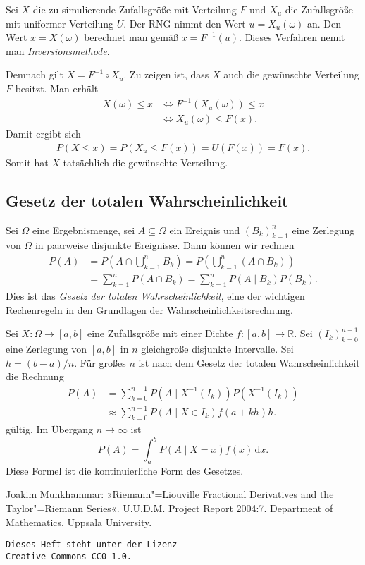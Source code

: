 \documentclass[a4paper,10pt,fleqn,twocolumn,twoside,dvipdfmx]{scrartcl}
\numberwithin{equation}{section}
\newcommand{\R}{\mathbb R}
\theoremstyle{rmbox}
\begin{document}
Sei $X$ die zu simulierende Zufallsgröße mit Verteilung $F$
und $X_u$ die Zufallsgröße mit uniformer Verteilung $U$. Der RNG
nimmt den Wert $u=X_u(\omega)$ an. Den Wert $x=X(\omega)$ berechnet
man gemäß $x=F^{-1}(u)$. Dieses Verfahren nennt man
\emph{Inversionsmethode}.

Demnach gilt $X=F^{-1}\circ X_u$. Zu zeigen ist, dass $X$ auch
die gewünschte Verteilung $F$ besitzt. Man erhält
\begin{align}
X(\omega)\le x&\iff F^{-1}(X_u(\omega))\le x\\
&\iff X_u(\omega)\le F(x).
\end{align}
Damit ergibt sich
\begin{gather}
P(X\le x) = P(X_u\le F(x)) = U(F(x)) = F(x).
\end{gather}
Somit hat $X$ tatsächlich die gewünschte Verteilung.

\subsection{Gesetz der totalen Wahrscheinlichkeit}

Sei $\Omega$ eine Ergebnismenge, sei $A\subseteq\Omega$ ein
Ereignis und $(B_k)_{k=1}^n$ eine Zerlegung von $\Omega$ in
paarweise disjunkte Ereignisse. Dann können wir rechnen
\begin{align*}
P(A) &= P(A\cap\bigcup_{k=1}^n B_k) = 
P(\bigcup_{k=1}^n (A\cap B_k))\\
&= \sum_{k=1}^n P(A\cap B_k)
= \sum_{k=1}^n P(A\mid B_k)P(B_k).
\end{align*}
Dies ist das \emph{Gesetz der totalen Wahrscheinlichkeit}, eine der
wichtigen Rechenregeln in den Grundlagen der
Wahrscheinlichkeitsrechnung.

Sei $X\colon\Omega\to [a,b]$ eine Zufallsgröße mit einer
Dichte $f\colon [a,b]\to \R$. Sei
$(I_k)_{k=0}^{n-1}$ eine Zerlegung von $[a,b]$ in $n$ gleichgroße
disjunkte Intervalle. Sei $h=(b-a)/n$. Für großes $n$
ist nach dem Gesetz der totalen Wahrscheinlichkeit die Rechnung
\begin{align*}
P(A) &= \sum_{k=0}^{n-1} P(A\mid X^{-1}(I_k))P(X^{-1}(I_k))\\
&\approx \sum_{k=0}^{n-1} P(A\mid X\in I_k)f(a+kh)h.
\end{align*}
gültig. Im Übergang $n\to\infty$ ist
\begin{equation}
P(A) = \int_a^b P(A\mid X=x)f(x)\,\mathrm dx.
\end{equation}
Diese Formel ist die kontinuierliche Form des Gesetzes.

\begin{thebibliography}{x}
\bibitem{} Joakim Munkhammar: »Riemann"=Liouville Fractional Derivatives
and the Taylor"=Riemann Series«. U.U.D.M. Project Report 2004:7.
Department of Mathematics, Uppsala University.
\end{thebibliography}

\vfill\noindent
\texttt{Dieses Heft steht unter der Lizenz\\
Creative Commons CC0 1.0.}
\end{document}
